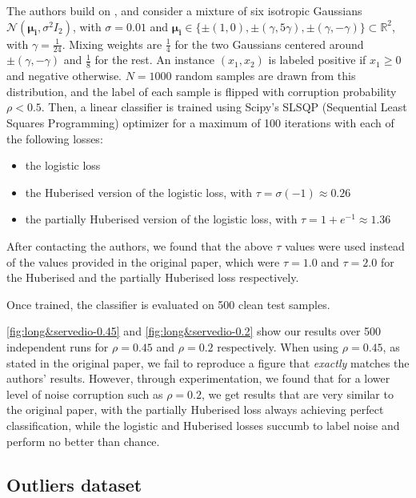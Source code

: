 The authors build on \textcite{long_random_2010}, and consider a mixture of six isotropic Gaussians $\mathcal{N}(\boldsymbol{\mu_i}, \sigma^2 I_2)$, with $\sigma=0.01$ and $\boldsymbol{\mu_i} \in \{\pm(1,0), \pm(\gamma, 5\gamma), \pm(\gamma, -\gamma)\} \subset \mathbb{R}^2$, with $\gamma = \frac{1}{24}$.
Mixing weights are $\frac{1}{4}$ for the two Gaussians centered around $\pm(\gamma, -\gamma)$ and $\frac{1}{8}$ for the rest.
An instance $(x_1,x_2)$ is labeled positive if $x_1 \geq 0$ and negative otherwise.
$N = 1000$ random samples are drawn from this distribution, and the label of each sample is flipped with corruption probability $\rho < 0.5$.
Then, a linear classifier is trained using Scipy's SLSQP (Sequential Least Squares Programming) optimizer for a maximum of 100 iterations with each of the following losses:
\begin{itemize}
    \item the logistic loss
    \item the Huberised version of the logistic loss, with $\tau = \sigma(-1) \approx 0.26$
    \item the partially Huberised version of the logistic loss, with $\tau = 1 + e^{-1} \approx 1.36$
\end{itemize}
After contacting the authors, we found that the above $\tau$ values were used instead of the values provided in the original paper, which were $\tau = 1.0$ and $\tau = 2.0$ for the Huberised and the partially Huberised loss respectively.

Once trained, the classifier is evaluated on 500 clean test samples.


\autoref{fig:long&servedio-0.45} and \autoref{fig:long&servedio-0.2} show our results over 500 independent runs for $\rho = 0.45$ and $\rho = 0.2$ respectively.
When using $\rho=0.45$, as stated in the original paper, we fail to reproduce a figure that \emph{exactly} matches the authors' results.
However, through experimentation, we found that for a lower level of noise corruption such as $\rho = 0.2$, we get results that are very similar to the original paper, with the partially Huberised loss always achieving perfect classification, while the logistic and Huberised losses succumb to label noise and perform no better than chance.


\subsection{Outliers dataset}

